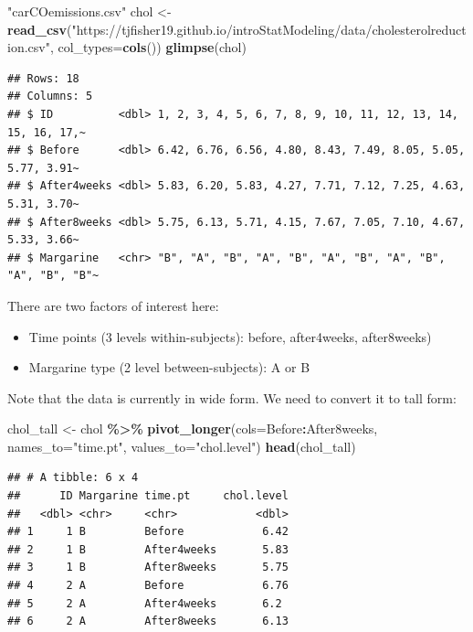 \documentclass[
]{book}
\newenvironment{Shaded}{\begin{snugshade}}{\end{snugshade}}
\newcommand{\AttributeTok}[1]{\textcolor[rgb]{0.13,0.29,0.53}{#1}}
\newcommand{\FunctionTok}[1]{\textcolor[rgb]{0.13,0.29,0.53}{\textbf{#1}}}
\newcommand{\NormalTok}[1]{#1}
\newcommand{\OtherTok}[1]{\textcolor[rgb]{0.56,0.35,0.01}{#1}}
\newcommand{\SpecialCharTok}[1]{\textcolor[rgb]{0.81,0.36,0.00}{\textbf{#1}}}
\newcommand{\StringTok}[1]{\textcolor[rgb]{0.31,0.60,0.02}{#1}}
\providecommand{\tightlist}{%
  \setlength{\itemsep}{0pt}\setlength{\parskip}{0pt}}
\begin{document}
\begin{Shaded}
\begin{Highlighting}[]
\StringTok{"carCOemissions.csv"}
\NormalTok{chol }\OtherTok{\textless{}{-}} \FunctionTok{read\_csv}\NormalTok{(}\StringTok{"https://tjfisher19.github.io/introStatModeling/data/cholesterolreduction.csv"}\NormalTok{, }\AttributeTok{col\_types=}\FunctionTok{cols}\NormalTok{())}
\FunctionTok{glimpse}\NormalTok{(chol)}
\end{Highlighting}
\end{Shaded}

\begin{verbatim}
## Rows: 18
## Columns: 5
## $ ID          <dbl> 1, 2, 3, 4, 5, 6, 7, 8, 9, 10, 11, 12, 13, 14, 15, 16, 17,~
## $ Before      <dbl> 6.42, 6.76, 6.56, 4.80, 8.43, 7.49, 8.05, 5.05, 5.77, 3.91~
## $ After4weeks <dbl> 5.83, 6.20, 5.83, 4.27, 7.71, 7.12, 7.25, 4.63, 5.31, 3.70~
## $ After8weeks <dbl> 5.75, 6.13, 5.71, 4.15, 7.67, 7.05, 7.10, 4.67, 5.33, 3.66~
## $ Margarine   <chr> "B", "A", "B", "A", "B", "A", "B", "A", "B", "A", "B", "B"~
\end{verbatim}

There are two factors of interest here:

\begin{itemize}
\tightlist
\item
  Time points (3 levels within-subjects): before, after4weeks, after8weeks)
\item
  Margarine type (2 level between-subjects): A or B
\end{itemize}

Note that the data is currently in wide form.
We need to convert it to tall form:

\begin{Shaded}
\begin{Highlighting}[]
\NormalTok{chol\_tall }\OtherTok{\textless{}{-}}\NormalTok{ chol }\SpecialCharTok{\%\textgreater{}\%} 
  \FunctionTok{pivot\_longer}\NormalTok{(}\AttributeTok{cols=}\NormalTok{Before}\SpecialCharTok{:}\NormalTok{After8weeks, }
               \AttributeTok{names\_to=}\StringTok{"time.pt"}\NormalTok{, }
               \AttributeTok{values\_to=}\StringTok{"chol.level"}\NormalTok{)}
\FunctionTok{head}\NormalTok{(chol\_tall)}
\end{Highlighting}
\end{Shaded}

\begin{verbatim}
## # A tibble: 6 x 4
##      ID Margarine time.pt     chol.level
##   <dbl> <chr>     <chr>            <dbl>
## 1     1 B         Before            6.42
## 2     1 B         After4weeks       5.83
## 3     1 B         After8weeks       5.75
## 4     2 A         Before            6.76
## 5     2 A         After4weeks       6.2 
## 6     2 A         After8weeks       6.13
\end{verbatim}
\end{document}
